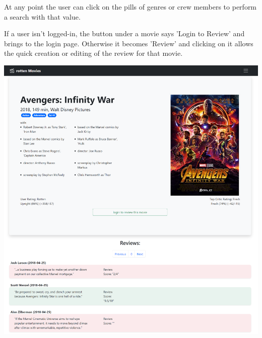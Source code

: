 At any point the user can click on the pills of genres or crew members to perform a search with that value.

If a user isn't logged-in, the button under a movie says 'Login to Review' and brings to the login page. Otherwise it becomes 'Review' and clicking on it allows the quick creation or editing of the review for that movie.
\begin{center}
\includegraphics[scale=0.45]{../../../images/user_manual/movie_page.png} 
\end{center}
\vspace{5pt}

